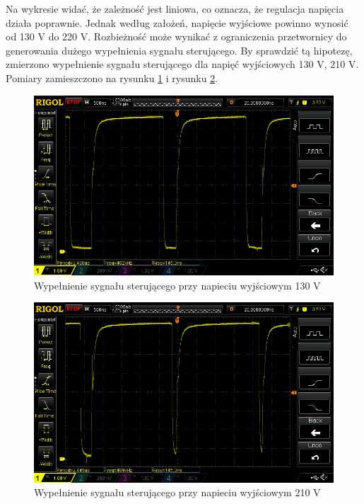 \documentclass[../main.tex]{subfiles}
\begin{document}
Na wykresie widać, że zależność jest liniowa, co oznacza, że regulacja napięcia działa poprawnie.
Jednak według założeń, napięcie wyjściowe powinno wynosić od 130 V do 220 V.
Rozbieżność może wynikać z ograniczenia przetwornicy do generowania dużego wypełnienia sygnału sterującego.
By sprawdzić tą hipotezę, zmierzono wypełnienie sygnału sterującego dla napięć wyjściowych 130 V, 210 V.
Pomiary zamieszczono na rysunku \ref{fig:duty_130} i rysunku \ref{fig:duty_210}.

\begin{figure}[H]
    \centering
    \includegraphics[width=1\textwidth]{duty_130.png}
    \caption{Wypełnienie sygnału sterującego przy napieciu wyjściowym 130 V}
    \label{fig:duty_130}
\end{figure}

\begin{figure}[H]
    \centering
    \includegraphics[width=1\textwidth]{duty_210.png}
    \caption{Wypełnienie sygnału sterującego przy napieciu wyjściowym 210 V}
    \label{fig:duty_210}
\end{figure}
\end{document}
